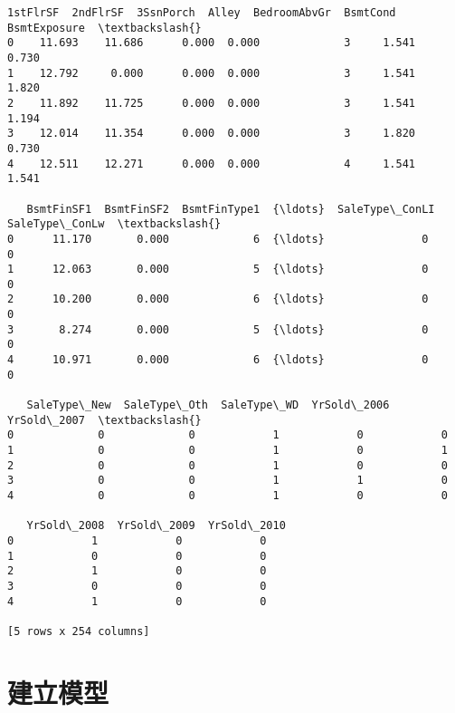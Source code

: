 \documentclass[11pt]{article}
\makeatletter
\newcommand{\boxspacing}{\kern\kvtcb@left@rule\kern\kvtcb@boxsep}
\newcommand{\prompt}[4]{
        \ttfamily\llap{{\color{#2}[#3]:\hspace{3pt}#4}}\vspace{-\baselineskip}
    }
\makeatother
\begin{document}
            \begin{tcolorbox}[breakable, size=fbox, boxrule=.5pt, pad at break*=1mm, opacityfill=0]
\prompt{Out}{outcolor}{28}{\boxspacing}
\begin{Verbatim}[commandchars=\\\{\}]
   1stFlrSF  2ndFlrSF  3SsnPorch  Alley  BedroomAbvGr  BsmtCond  BsmtExposure  \textbackslash{}
0    11.693    11.686      0.000  0.000             3     1.541         0.730
1    12.792     0.000      0.000  0.000             3     1.541         1.820
2    11.892    11.725      0.000  0.000             3     1.541         1.194
3    12.014    11.354      0.000  0.000             3     1.820         0.730
4    12.511    12.271      0.000  0.000             4     1.541         1.541

   BsmtFinSF1  BsmtFinSF2  BsmtFinType1  {\ldots}  SaleType\_ConLI  SaleType\_ConLw  \textbackslash{}
0      11.170       0.000             6  {\ldots}               0               0
1      12.063       0.000             5  {\ldots}               0               0
2      10.200       0.000             6  {\ldots}               0               0
3       8.274       0.000             5  {\ldots}               0               0
4      10.971       0.000             6  {\ldots}               0               0

   SaleType\_New  SaleType\_Oth  SaleType\_WD  YrSold\_2006  YrSold\_2007  \textbackslash{}
0             0             0            1            0            0
1             0             0            1            0            1
2             0             0            1            0            0
3             0             0            1            1            0
4             0             0            1            0            0

   YrSold\_2008  YrSold\_2009  YrSold\_2010
0            1            0            0
1            0            0            0
2            1            0            0
3            0            0            0
4            1            0            0

[5 rows x 254 columns]
\end{Verbatim}
\end{tcolorbox}
        
    \hypertarget{ux5efaux7acbux6a21ux578b}{%
\section{建立模型}\label{ux5efaux7acbux6a21ux578b}}
\end{document}
